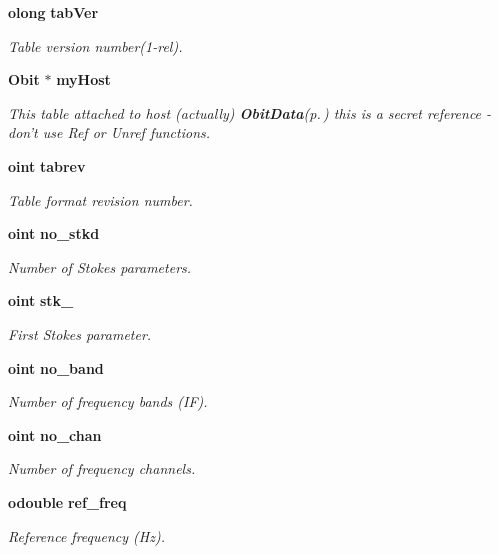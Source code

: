 \begin{CompactItemize}
{\bf olong} {\bf tab\-Ver}
\begin{CompactList}\small\item\em Table version number(1-rel). \item\end{CompactList}\item 
{\bf Obit} $\ast$ {\bf my\-Host}
\begin{CompactList}\small\item\em This table attached to host (actually) {\bf Obit\-Data}{\rm (p.\,\pageref{structObitData})} this is a secret reference - don't use Ref or Unref functions. \item\end{CompactList}\item 
{\bf oint} {\bf tabrev}
\begin{CompactList}\small\item\em Table format revision number. \item\end{CompactList}\item 
{\bf oint} {\bf no\_\-stkd}
\begin{CompactList}\small\item\em Number of Stokes parameters. \item\end{CompactList}\item 
{\bf oint} {\bf stk\_}
\begin{CompactList}\small\item\em First Stokes parameter. \item\end{CompactList}\item 
{\bf oint} {\bf no\_\-band}
\begin{CompactList}\small\item\em Number of frequency bands (IF). \item\end{CompactList}\item 
{\bf oint} {\bf no\_\-chan}
\begin{CompactList}\small\item\em Number of frequency channels. \item\end{CompactList}\item 
{\bf odouble} {\bf ref\_\-freq}
\begin{CompactList}\small\item\em Reference frequency (Hz). \item\end{CompactList}\item 

\end{CompactItemize}
